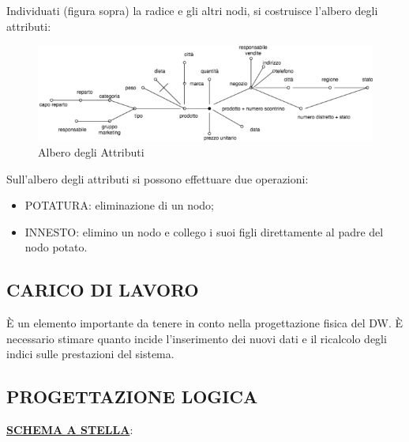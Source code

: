Individuati (figura sopra) la radice e gli altri nodi, si costruisce l’albero degli attributi:

\begin{center}
\begin{figure}[H]
\centering
\includegraphics[scale=0.8]{figures/attributes_tree.png}
\caption{Albero degli Attributi}
\end{figure}
\end{center}

Sull’albero degli attributi si possono effettuare due operazioni:  

\begin{itemize}

\item{POTATURA}: eliminazione di un nodo;
\item{INNESTO}: elimino un nodo e collego i suoi figli direttamente al padre del nodo potato.

\end{itemize}


\subsection{CARICO DI LAVORO}

È un elemento importante da tenere in conto nella progettazione fisica del DW. È necessario stimare quanto incide l’inserimento dei nuovi dati e il ricalcolo degli indici sulle prestazioni del sistema. 


\subsection{PROGETTAZIONE LOGICA}

\begin{center}\underline{\textbf{SCHEMA A STELLA}}:\end{center}

